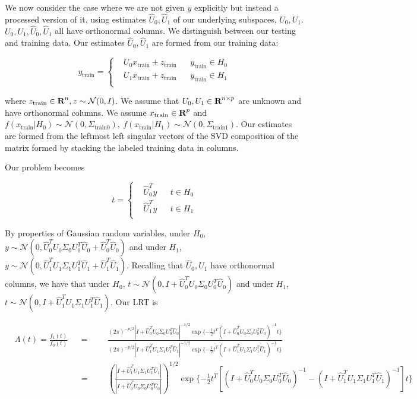 \documentclass[english]{article}
\begin{document}
We now consider the case where we are not given $y$ explicitly but instead a processed version of it, using estimates $\hat{U}_0,\hat{U}_1$ of our underlying subspaces, $U_0, U_1$. $U_0,U_1,\hat{U}_0,\hat{U}_1$ all have orthonormal columns. We distinguish between our testing and training data. Our estimates $\hat{U}_0,\hat{U}_1$ are formed from our training data:

\begin{equation}
y_{\text{train}}=\left\{
\begin{aligned}
&U_0x_{\text{train}}+z_{\text{train}}
&& y_{\text{train}}\in H_0\\
&U_1x_{\text{train}}+z_{\text{train}}
&& y_{\text{train}}\in H_1\\
\end{aligned}\right.
\end{equation}

where $z_{\text{train}}\in{\mbox{\bf R}}^n, z\sim\mathcal{N}(0,I)$. We assume that $U_0,U_1\in{\mbox{\bf R}}^{n\times p}$ are unknown and have orthonormal columns. We assume $x_{\text{train}}\in{\mbox{\bf R}}^p$ and $f(x_{\text{train}}|H_0)\sim\mathcal{N}(0,\Sigma_{\text{train}0}), ~f(x_{\text{train}}|H_1)\sim\mathcal{N}(0,\Sigma_{\text{train}1})$. Our estimates are formed from the leftmost left singular vectors of the SVD composition of the matrix formed by stacking the labeled training data in columns.

Our problem becomes

\begin{equation}
t=\left\{
\begin{aligned}
&\hat{U}_0^Ty
&& t\in H_0\\
&\hat{U}_1^Ty
&& t\in H_1\\
\end{aligned}\right.
\end{equation}

By properties of Gaussian random variables, under $H_0$, $y\sim\mathcal{N}(0, \hat{U}_0^TU_0\Sigma_0U_0^T\hat{U}_0 + \hat{U}_0^T\hat{U}_0)$ and under $H_1$, $y\sim\mathcal{N}(0, \hat{U}_1^TU_1\Sigma_1U_1^T\hat{U}_1 + \hat{U}_1^T\hat{U}_1)$. Recalling that $\hat{U}_0,\hat{U}_1$ have orthonormal columns, we have that under $H_0$, $t\sim\mathcal{N}(0,I+\hat{U}_0^TU_0\Sigma_0U_0^T\hat{U}_0)$ and under $H_1$, $t\sim\mathcal{N}(0,I+\hat{U}_1^TU_1\Sigma_1U_1^T\hat{U}_1)$. Our LRT is

\begin{equation}
\begin{aligned}
&\Lambda(t) = \frac{f_1(t)}{f_0(t)}
&& =
&&&\frac{(2\pi)^{-p/2}|I+\hat{U}_0^TU_0\Sigma_0U_0^T\hat{U}_0|^{-1/2}\exp\{-\frac{1}{2}t^T(I+\hat{U}_0^TU_0\Sigma_0U_0^T\hat{U}_0)^{-1}t\}}{(2\pi)^{-p/2}|I+\hat{U}_1^TU_1\Sigma_1U_1^T\hat{U}_1|^{-1/2}\exp\{-\frac{1}{2}t^T(I+\hat{U}_1^TU_1\Sigma_1U_1^T\hat{U}_1)^{-1}t\}}\\
&&& =
&&& \left(\frac{|I+\hat{U}_1^TU_1\Sigma_1U_1^T\hat{U}_1|}{|I+\hat{U}_0^TU_0\Sigma_0U_0^T\hat{U}_0|}\right)^{1/2}\exp\{-\frac{1}{2}t^T\left[\left(I+\hat{U}_0^TU_0\Sigma_0U_0^T\hat{U}_0\right)^{-1}-\left(I+\hat{U}_1^TU_1\Sigma_1U_1^T\hat{U}_1\right)^{-1}\right]t\}\\
\end{aligned}
\end{equation}
\end{document}
